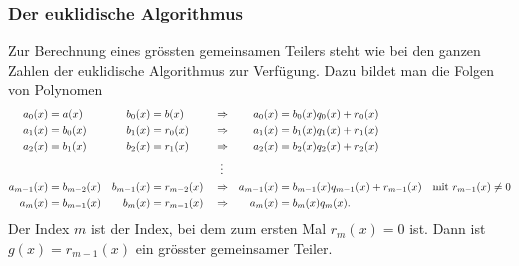%
%
\subsubsection{Der euklidische Algorithmus}
%
%
Zur Berechnung eines grössten gemeinsamen Teilers steht wie bei den
ganzen Zahlen der euklidische Algorithmus zur Verfügung.
Dazu bildet man die Folgen von Polynomen
\[
\begin{aligned}
a_0(x)&=a(x) & b_0(x) &= b(x)
&
&\Rightarrow&
a_0(x)&=b_0(x) q_0(x) + r_0(x) &&
\\
a_1(x)&=b_0(x) & b_1(x) &= r_0(x)
&
&\Rightarrow&
a_1(x)&=b_1(x) q_1(x) + r_1(x) &&
\\
a_2(x)&=b_1(x) & b_2(x) &= r_1(x)
&
&\Rightarrow&
a_2(x)&=b_2(x) q_2(x) + r_2(x) &&
\\
&&&&&\hspace*{2mm}\vdots&&
\\
a_{m-1}(x)&=b_{m-2}(x) & b_{m-1}(x) &= r_{m-2}(x) 
&
&\Rightarrow&
a_{m-1}(x)&=b_{m-1}(x)q_{m-1}(x) + r_{m-1}(x) &\text{mit }r_{m-1}(x)&\ne 0
\\
a_m(x)&=b_{m-1}(x) & b_m(x)&=r_{m-1}(x)
&
&\Rightarrow&
a_m(x)&=b_m(x)q_m(x).&&
\end{aligned}
\]
Der Index $m$ ist der Index, bei dem zum ersten Mal $r_m(x)=0$ ist.
Dann ist $g(x)=r_{m-1}(x)$ ein grösster gemeinsamer Teiler.

%
%
